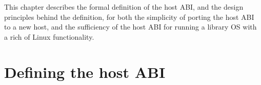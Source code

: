 This chapter describes the formal definition of the \graphene{} host ABI, and 
the design principles behind the definition, for both the simplicity of porting the host ABI to a new host, and the sufficiency of the host ABI for running a library OS with a rich of Linux functionality.






\section{Defining the host ABI}


\begin{comment}
This chapter describes the formal definition of the host ABI, and discusses the rationale behind the definition, based on the design principles of \graphene{}.
The host ABI is a key component
to the \graphene{} design,
to simplify the OS development effort for achieving or restoring compatibility.
This chapter shows how to select the host ABI as a ``pinch point'' in a Linux-compatible OS, to virtualize OS components into the user space.
\end{comment}




